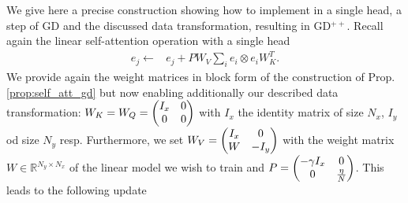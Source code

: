\documentclass{article}
\theoremstyle{plain}
\theoremstyle{definition}
\theoremstyle{remark}
\begin{document}
We give here a precise construction showing how to implement in a single head, a step of GD and the discussed data transformation, resulting in GD$^{++}$. Recall again the linear self-attention operation with a single head
\begin{align}
e_j  \leftarrow & e_j + P W_{V}\sum_{i} e_{i} \otimes e_{i} W_{K}^T.
\end{align}
We provide again the weight matrices in block form of the construction of Prop. \ref{prop:self_att_gd} but now enabling additionally our described data transformation: $W_{K} = W_{Q} = \left(\begin{array}{@{}c c@{}}
  I_x
  & 0 \\
  0 &
  0
\end{array}\right)
$ with $I_x$ the identity matrix of size $N_x$, $I_y$ od size $N_y$ resp. Furthermore, we set $W_{V} = \left(\begin{array}{@{}c c@{}}
  I_x
  & 0 \\
  W &
  -I_y
\end{array}\right)$ with the weight matrix $W \in \mathbb{R}^{N_y \times N_x}$ of the linear model we wish to train and 
$P = \left(\begin{array}{@{}c c@{}}
  -\gamma I_x
  & 0 \\
  0 &
  \frac{\eta}{N}
\end{array}\right)$. This leads to the following update
\end{document}
